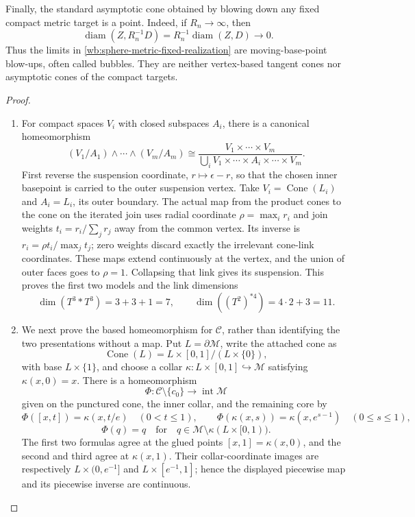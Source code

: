\begin{proposition}
Finally, the standard asymptotic cone obtained by blowing down any fixed
compact metric target is a point.  Indeed, if \(R_n\to\infty\), then
\[
 \operatorname{diam}(Z,R_n^{-1}D)
 =R_n^{-1}\operatorname{diam}(Z,D)\longrightarrow0.
\]
Thus the limits in \cref{wb:sphere-metric-fixed-realization} are
moving-base-point blow-ups, often called bubbles.  They are neither
vertex-based tangent cones nor asymptotic cones of the compact targets.
\end{proposition}



\begin{proof}
\begin{enumerate}[label=\arabic*.,leftmargin=*]
\item For compact spaces \(V_i\) with closed subspaces \(A_i\), there is a
canonical homeomorphism
\[
 (V_1/A_1)\wedge\cdots\wedge(V_m/A_m)
 \cong
 \frac{V_1\times\cdots\times V_m}
      {\bigcup_iV_1\times\cdots\times A_i\times\cdots\times V_m}.
\]
First reverse the suspension coordinate, $r\mapsto\epsilon-r$, so that the chosen inner basepoint is carried to the outer suspension vertex. Take $V_i=\operatorname{Cone}(L_i)$ and $A_i=L_i$, its outer boundary.
The actual map from the product cones to the cone on the iterated join uses radial coordinate $\rho=\max_i r_i$ and join weights $t_i=r_i/\sum_jr_j$ away from the common vertex. Its inverse is $r_i=\rho t_i/\max_jt_j$; zero weights discard exactly the irrelevant cone-link coordinates. These maps extend continuously at the vertex, and the union of outer faces goes to $\rho=1$.
Collapsing that link gives its suspension.  This proves the first two
models and the link dimensions
\[
 \dim(T^3*T^3)=3+3+1=7,
 \qquad
 \dim((T^2)^{*4})=4\cdot2+3=11.
\]

\item We next prove the based homeomorphism for \(\mathcal C\), rather than
identifying the two presentations without a map.  Put
\(L=\partial\mathcal M\), write the attached cone as
\[
 \operatorname{Cone}(L)
 =L\times[0,1]/(L\times\{0\}),
\]
with base \(L\times\{1\}\), and choose a collar
\(\kappa:L\times[0,1]\hookrightarrow\mathcal M\) satisfying
\(\kappa(x,0)=x\).  There is a homeomorphism
\[
 \Phi:\mathcal C\setminus\{c_0\}
       \longrightarrow\operatorname{int}\mathcal M
\]
given on the punctured cone, the inner collar, and the remaining core by
\[
 \Phi([x,t])=\kappa(x,t/e)\quad(0<t\leq1),\qquad
 \Phi(\kappa(x,s))=\kappa(x,e^{s-1})\quad(0\leq s\leq1),
\]
\[
 \Phi(q)=q
 \quad\text{for}\quad
 q\in\mathcal M\setminus\kappa(L\times[0,1)).
\]
The first two formulas agree at the glued points
\([x,1]=\kappa(x,0)\), and the second and third agree at
\(\kappa(x,1)\).  Their collar-coordinate images are respectively
\(L\times(0,e^{-1}]\) and \(L\times[e^{-1},1]\); hence the displayed
piecewise map and its piecewise inverse are continuous.


\end{enumerate}
\end{proof}
